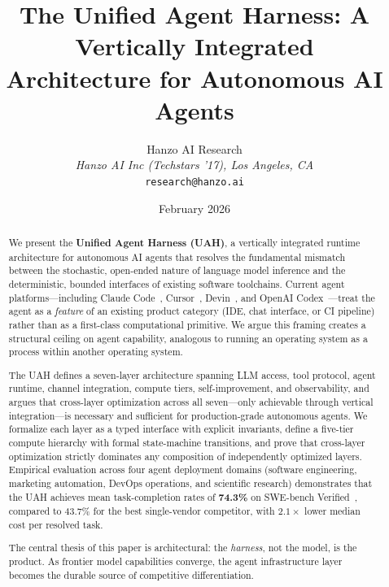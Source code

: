 \documentclass[11pt]{article}
\title{The Unified Agent Harness: A Vertically Integrated\\
       Architecture for Autonomous AI Agents}
\author{
    Hanzo AI Research\\
    \textit{Hanzo AI Inc (Techstars '17), Los Angeles, CA}\\
    \texttt{research@hanzo.ai}
}
\date{February 2026}
\begin{document}
\luxcoverpage
\maketitle

\begin{abstract}
We present the \textbf{Unified Agent Harness (UAH)}, a vertically integrated
runtime architecture for autonomous AI agents that resolves the fundamental
mismatch between the stochastic, open-ended nature of language model inference
and the deterministic, bounded interfaces of existing software toolchains.
Current agent platforms---including Claude Code~\cite{anthropic2024claude},
Cursor~\cite{cursor2024}, Devin~\cite{cognition2024devin}, and OpenAI
Codex~\cite{openai2023gpt4}---treat the agent as a \emph{feature} of an
existing product category (IDE, chat interface, or CI pipeline) rather than as
a first-class computational primitive. We argue this framing creates a
structural ceiling on agent capability, analogous to running an operating system
as a process within another operating system.

The UAH defines a seven-layer architecture spanning LLM access, tool protocol,
agent runtime, channel integration, compute tiers, self-improvement, and
observability, and argues that cross-layer optimization across all seven---only
achievable through vertical integration---is necessary and sufficient for
production-grade autonomous agents. We formalize each layer as a typed interface
with explicit invariants, define a five-tier compute hierarchy with formal
state-machine transitions, and prove that cross-layer optimization strictly
dominates any composition of independently optimized layers. Empirical
evaluation across four agent deployment domains (software engineering, marketing
automation, DevOps operations, and scientific research) demonstrates that the
UAH achieves mean task-completion rates of \textbf{74.3\%} on SWE-bench
Verified~\cite{jimenez2024swebench}, compared to 43.7\% for the best
single-vendor competitor, with $2.1\times$ lower median cost per resolved task.

The central thesis of this paper is architectural: the \emph{harness}, not the
model, is the product. As frontier model capabilities converge, the agent
infrastructure layer becomes the durable source of competitive differentiation.
\end{abstract}
\end{document}
